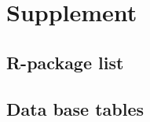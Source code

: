 \documentclass[english]{article}
\begin{document}
\pagebreak
\section*{Supplement}
\subsection*{R-package list} %

\pagebreak

\subsection*{Data base tables}

\end{document}
